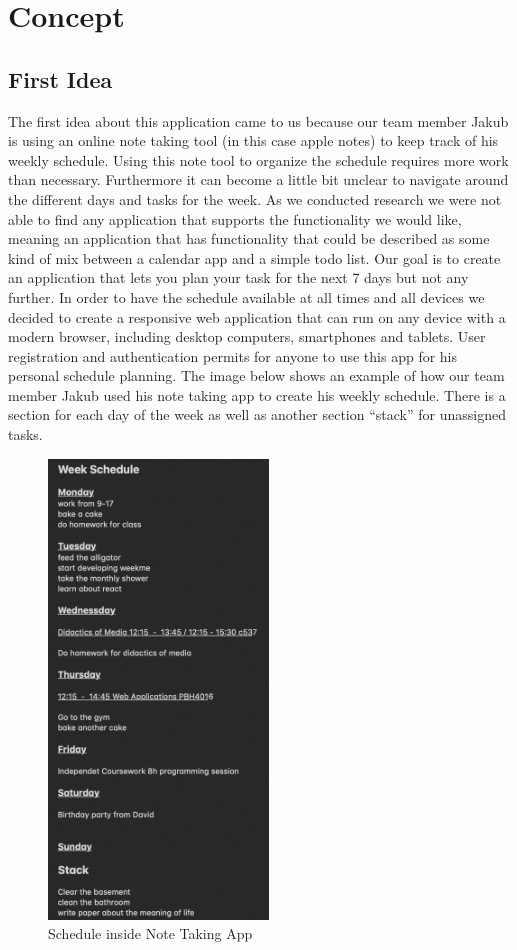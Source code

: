 \section{Concept}


\subsection{First Idea}


The first idea about this application came to us because our team member Jakub is using an online note taking tool  (in this case apple notes) to keep track of his weekly schedule. Using this note tool to organize the schedule requires more work than necessary. Furthermore it can become a little bit unclear to navigate around the different days and tasks for the week. As we conducted research we were not able to find any application that supports the functionality we would like, meaning an application that has functionality that could be described as some kind of mix between a calendar app and a simple todo list. Our goal is to create an application that lets you plan your task for the next 7 days but not any further. In order to have the schedule available at all times and all devices we decided to create a responsive web application that can run on any device with a modern browser, including desktop computers, smartphones and tablets. User registration and authentication permits for anyone to use this app for his personal schedule planning. The image below shows an example of how our team member Jakub used his note taking app to create his weekly schedule. There is a section for each day of the week as well as another section “stack” for unassigned tasks.   

	\begin{figure}[H] 
		\centering 
		\includegraphics[height=12.2cm]{figures/idea}     
		\caption{Schedule inside Note Taking App}      
	\end{figure}  

